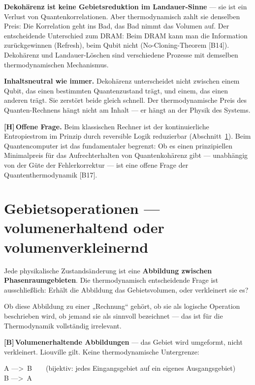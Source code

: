 \documentclass[11pt,a4paper]{article}
\newcommand{\LB}{\textcolor{layB}{\textbf{\footnotesize\textsf{[B]}}}\,}
\newcommand{\LH}{\textcolor{layH}{\textbf{\footnotesize\textsf{[H]}}}\,}
\begin{document}
\textbf{Dekohärenz ist keine Gebietsreduktion im Landauer-Sinne} --- sie ist ein
Verlust von Quantenkorrelationen. Aber thermodynamisch zahlt sie denselben Preis:
Die Korrelation geht ins Bad, das Bad nimmt das Volumen auf. Der entscheidende
Unterschied zum DRAM: Beim DRAM kann man die Information zurückgewinnen
(Refresh), beim Qubit nicht (No-Cloning-Theorem [B14]). Dekohärenz und
Landauer-Löschen sind verschiedene Prozesse mit demselben thermodynamischen
Mechanismus.

\textbf{Inhaltsneutral wie immer.} Dekohärenz unterscheidet nicht zwischen einem
Qubit, das einen bestimmten Quantenzustand trägt, und einem, das einen anderen
trägt. Sie zerstört beide gleich schnell. Der thermodynamische Preis des
Quanten-Rechnens hängt nicht am Inhalt --- er hängt an der Physik des Systems.

\LH \textbf{Offene Frage.} Beim klassischen Rechner ist der kontinuierliche
Entropiestrom im Prinzip durch reversible Logik reduzierbar
(Abschnitt~\ref{sec:gebietsop}). Beim Quantencomputer ist das fundamentaler
begrenzt: Ob es einen prinzipiellen Minimalpreis für das Aufrechterhalten von
Quantenkohärenz gibt --- unabhängig von der Güte der Fehlerkorrektur --- ist eine
offene Frage der Quantenthermodynamik [B17].

\section{Gebietsoperationen --- volumenerhaltend oder volumenverkleinernd}
\label{sec:gebietsop}

Jede physikalische Zustandsänderung ist eine \textbf{Abbildung zwischen
Phasenraumgebieten}. Die thermodynamisch entscheidende Frage ist ausschließlich:
Erhält die Abbildung das Gebietsvolumen, oder verkleinert sie es?

Ob diese Abbildung zu einer „Rechnung“ gehört, ob sie als logische Operation
beschrieben wird, ob jemand sie als sinnvoll bezeichnet --- das ist für die
Thermodynamik vollständig irrelevant.

\LB \textbf{Volumenerhaltende Abbildungen} --- das Gebiet wird umgeformt, nicht
verkleinert. Liouville gilt. Keine thermodynamische Untergrenze:

\begin{center}
\begin{minipage}{0.75\textwidth}
\ttfamily\small
A --->\ B\ \ \ \ (bijektiv: jedes Eingangsgebiet auf ein eigenes Ausgangsgebiet)\\
B --->\ A
\end{minipage}
\end{center}
\end{document}
